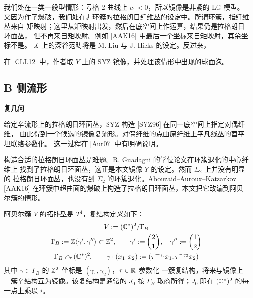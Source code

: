 \begin{remark}\label{rem:general-type}
我们处在一类一般型情形：亏格 $2$ 曲线上 $c_1<0$，所以镜像是非紧的 LG 模型。
又因为作了爆破，我们处在非环簇的拉格朗日纤维丛的设定中。所谓环簇，指纤维丛来自
矩映射；这里从矩映射出发，然后在底空间上作运算，结果仍是拉格朗日环面丛，
但不再来自矩映射。例如 [AAK16] 中最后一个坐标来自矩映射，其余坐标不是。
$X$ 上的深谷范畴将是 M. Liu 与 J. Hicks 的设定。反过来，
\end{remark}

在 [CLL12] 中，作者取 $Y$ 上的 SYZ 镜像，并处理该情形中出现的球面泡。

\subsection{B 侧流形}

\medskip\noindent\textbf{复几何}\par

\begin{remark}\label{rem:sy-input}
给定辛流形上的拉格朗日环面丛，SYZ 构造 [SYZ96] 在同一底空间上指定对偶纤维，
由此得到一个候选的镜像复流形。对偶纤维的点由原纤维上平凡线丛的酉平坦联络参数化。
这一过程在 [Aur07] 中有明确说明。
\end{remark}

构造合适的拉格朗日环面丛是难题。R. Guadagni 的学位论文在环簇退化的中心纤维上
找到了拉格朗日环面丛，这正是本文镜像 $Y$ 的设定。然而 $\Sigma_2$ 上并没有明显的
拉格朗日环面丛，也没有到 $\Sigma_2$ 的环簇退化。Abouzaid--Auroux--Katzarkov
[AAK16] 在环簇中超曲面的爆破上构造了拉格朗日环面丛，本文把它改编到阿贝尔簇的情形。

\begin{definition}[阿贝尔簇的定义]\label{def:abelian-variety}
阿贝尔簇 $V$ 的拓扑型是 $T^4$，复结构定义如下：
\begin{equation}\label{eq:1-2}
\begin{gathered}
V := (\mathbb{C}^*)^2/\Gamma_B\\
\Gamma_B := \mathbb{Z}\langle\gamma',\gamma''\rangle\subset\mathbb{Z}^2,\qquad
\gamma' := \binom{2}{1},\quad \gamma'' := \binom{1}{2}\\
\Gamma_B\curvearrowright(\mathbb{C}^*)^2,\qquad
\gamma\cdot(x_1,x_2) := (\tau^{-\gamma_1}x_1,\tau^{-\gamma_2}x_2)
\end{gathered}
\end{equation}
其中 $\gamma\in\Gamma_B$ 的 $\mathbb{Z}^2$-坐标是 $(\gamma_1,\gamma_2)$，$\tau\in\mathbb{R}$ 参数化
一簇复结构，将来与镜像上一簇辛结构互为镜像。该复结构是通常的 $J_0$ 按 $\Gamma_B$
取商所得；$J_0$ 即在 $(\mathbb{C}^*)^2$ 的每一点上乘以 $i$。
\end{definition}

